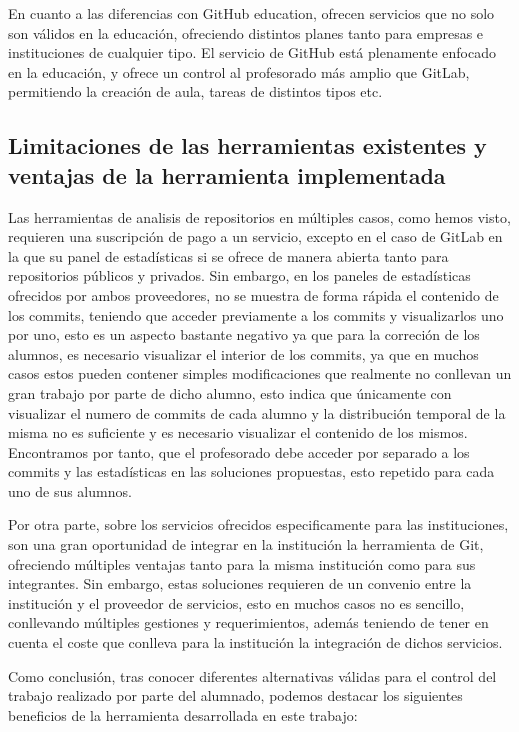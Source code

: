 En cuanto a las diferencias con GitHub education, ofrecen servicios que no
solo son válidos en la educación, ofreciendo distintos planes tanto para
empresas e instituciones de cualquier tipo. El servicio de GitHub está
plenamente enfocado en la educación, y ofrece un control al profesorado más
amplio que GitLab, permitiendo la creación de aula, tareas de distintos
tipos etc.


\subsection{Limitaciones de las herramientas existentes y ventajas de la
  herramienta implementada}

Las herramientas de analisis de repositorios en múltiples casos, como hemos
visto, requieren una suscripción de pago a un servicio, excepto en el caso
de GitLab en la que su panel de estadísticas si se ofrece de manera abierta
tanto para repositorios públicos y privados. Sin embargo, en los paneles de
estadísticas ofrecidos por ambos proveedores, no se muestra de forma rápida
el contenido de los commits, teniendo que acceder previamente a los commits
y visualizarlos uno por uno, esto es un aspecto bastante negativo ya que
para la correción de los alumnos, es necesario visualizar el interior de
los commits, ya que en muchos casos estos pueden contener simples
modificaciones que realmente no conllevan un gran trabajo por parte de
dicho alumno, esto indica que únicamente con visualizar el numero de
commits de cada alumno y la distribución temporal de la misma no es
suficiente y es necesario visualizar el contenido de los mismos.
Encontramos por tanto, que el profesorado debe acceder por separado a los
commits y las estadísticas en las soluciones propuestas, esto repetido para
cada uno de sus alumnos.

Por otra parte, sobre los servicios ofrecidos especificamente para las
instituciones, son una gran oportunidad de integrar en la institución la
herramienta de Git, ofreciendo múltiples ventajas tanto para la misma
institución como para sus integrantes. Sin embargo, estas soluciones
requieren de un convenio entre la institución y el proveedor de servicios,
esto en muchos casos no es sencillo, conllevando múltiples gestiones y
requerimientos, además teniendo de tener en cuenta el coste que conlleva
para la institución la integración de dichos servicios.

Como conclusión, tras conocer diferentes alternativas válidas para el
control del trabajo realizado por parte del alumnado, podemos destacar los
siguientes beneficios de la herramienta desarrollada en este trabajo:

